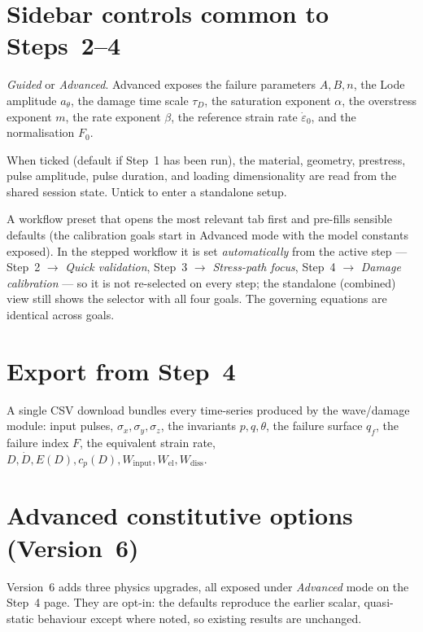 \documentclass[11pt,a4paper,openany]{book}
\theoremstyle{handbook}
\newcommand{\sig}{\sigma}
\newcommand{\eps}{\varepsilon}
\newcommand{\epsdot}{\dot\eps}
\begin{document}
\section{Sidebar controls common to Steps~2--4}

\begin{description}[leftmargin=2em,style=nextline]
  \item[Control level] \emph{Guided} or \emph{Advanced}. Advanced exposes
    the failure parameters $A,B,n$, the Lode amplitude $a_\theta$, the
    damage time scale $\tau_D$, the saturation exponent $\alpha$, the
    overstress exponent $m$, the rate exponent $\beta$, the reference
    strain rate $\epsdot_0$, and the normalisation $F_0$.
  \item[Use Step 1 setup] When ticked (default if Step~1 has been run),
    the material, geometry, prestress, pulse amplitude, pulse duration,
    and loading dimensionality are read from the shared session state.
    Untick to enter a standalone setup.
  \item[Analysis goal] A workflow preset that opens the most relevant tab
    first and pre-fills sensible defaults (the calibration goals start in
    Advanced mode with the model constants exposed). In the stepped workflow
    it is set \emph{automatically} from the active step --- Step~2 $\to$
    \emph{Quick validation}, Step~3 $\to$ \emph{Stress-path focus}, Step~4
    $\to$ \emph{Damage calibration} --- so it is not re-selected on every
    step; the standalone (combined) view still shows the selector with all
    four goals. The governing equations are identical across goals.
\end{description}

\section{Export from Step~4}

A single CSV download bundles every time-series produced by the
wave/damage module: input pulses, $\sig_x,\sig_y,\sig_z$, the invariants
$p,q,\theta$, the failure surface $q_f$, the failure index $F$, the
equivalent strain rate, $D,\dot D,E(D),c_p(D),W_{\text{input}},
W_{\text{el}},W_{\text{diss}}$.

\section{Advanced constitutive options (Version~6)}\label{sec:v6-advanced}

Version~6 adds three physics upgrades, all exposed under \emph{Advanced} mode on
the Step~4 page. They are opt-in: the defaults reproduce the earlier scalar,
quasi-static behaviour except where noted, so existing results are unchanged.
\end{document}
